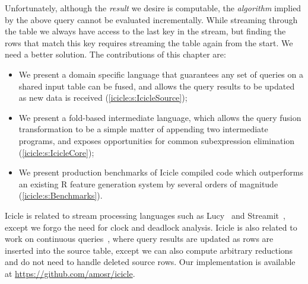 Unfortunately, although the \emph{result} we desire is computable, the \emph{algorithm} implied by the above query cannot be evaluated incrementally.
While streaming through the table we always have access to the last key in the stream, but finding the rows that match this key requires streaming the table again from the start.
We need a better solution.
The contributions of this chapter are:
\begin{itemize}
\item
  We present a domain specific language that guarantees any set of queries on a shared input table can be fused, and allows the query results to be updated as new data is received (\autoref{icicle:s:IcicleSource});

\item
  We present a fold-based intermediate language, which allows the query fusion transformation to be a simple matter of appending two intermediate programs, and exposes opportunities for common subexpression elimination (\autoref{icicle:s:IcicleCore});

\item
  We present production benchmarks of Icicle compiled code which outperforms an existing R feature generation system by several orders of magnitude (\autoref{icicle:s:Benchmarks}). 
\end{itemize}


Icicle is related to stream processing languages such as Lucy~\cite{mandel2010lucy} and Streamit~\cite{thies2002streamit}, except we forgo the need for clock and deadlock analysis.
Icicle is also related to work on continuous queries~\cite{arasu2003cql}, where query results are updated as rows are inserted into the source table, except we can also compute arbitrary reductions and do not need to handle deleted source rows.
Our implementation is available at \url{https://github.com/amosr/icicle}.
